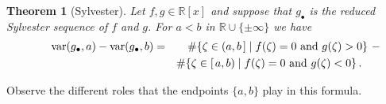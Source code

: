 \documentclass[12pt]{amsart}
\newtheorem{theorem}{Theorem}
\theoremstyle{definition}
\newcommand{\RR}{\mathbb{R}}
\DeclareMathOperator{\var}{{\rm var}}
\begin{document}
\begin{theorem}[Sylvester]
  \label{Th:Sylvester}
  Let $f,g\in\RR[x]$ and suppose that $g_\bullet$ is the reduced Sylvester sequence of $f$ and $g$.
  For $a<b$ in $\RR\cup\{\pm\infty\}$ we have
  \begin{eqnarray*}
    \qquad\var(g_\bullet,a)-\var(g_\bullet,b)&=&
    \#\{\zeta\in(a,b\hspace{.05cm}]\mid f(\zeta)=0\mbox{ and } g(\zeta)>0\}  \ -\
      \\
    && \#\{\zeta\in[\hspace{.05cm}a,b)\mid f(\zeta)=0\mbox{ and } g(\zeta)<0\}\,.\qquad
  \end{eqnarray*}
\end{theorem}

Observe the different roles that the endpoints $\{a,b\}$ play in this formula.
\end{document}
